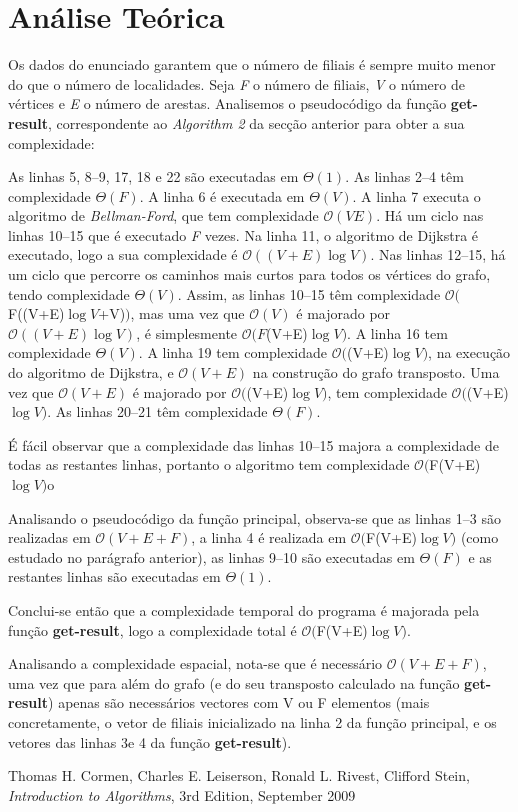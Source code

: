 \documentclass[12pt,a4paper,notitlepage]{article}
\renewcommand{\O}[1]{$\mathcal{O}(#1)$}
\begin{document}
\section{Análise Teórica}
Os dados do enunciado garantem que o número de filiais é sempre muito menor do que o número de localidades.
Seja \emph{F} o número de filiais, \emph{V} o número de vértices e \emph{E} o número de arestas.
Analisemos o pseudocódigo da função \textbf{get-result}, correspondente ao \emph{Algorithm 2} da secção anterior para obter a sua complexidade:

As linhas 5, 8--9, 17, 18 e 22 são executadas em $\Theta(1)$.
As linhas 2--4 têm complexidade $\Theta(F)$.
A linha 6 é executada em $\Theta(V)$.
A linha 7 executa o algoritmo de \emph{Bellman-Ford}, que tem complexidade \O{VE}.
Há um ciclo nas linhas 10--15 que é executado \emph{F} vezes.
Na linha 11, o algoritmo de Dijkstra é executado, logo a sua complexidade é \O{(V+E)\log{V}}.
Nas linhas 12--15, há um ciclo que percorre os caminhos mais curtos para todos os vértices do grafo, tendo complexidade $\Theta(V)$.
Assim, as linhas 10--15 têm complexidade \O{$F((V+E)$\log{V}$+V)$}, mas uma vez que \O{V} é majorado por \O{(V+E)\log{V}}, é simplesmente \O{F$(V+E)$\log{V}}.
A linha 16 tem complexidade $\Theta(V)$.
A linha 19 tem complexidade \O{$(V+E)$\log{V}}, na execução do algoritmo de Dijkstra, e \O{V+E} na construção do grafo transposto. Uma vez que \O{V+E} é majorado por \O{$(V+E)$\log{V}}, tem complexidade \O{$(V+E)$\log{V}}.
As linhas 20--21 têm complexidade $\Theta(F)$.

É fácil observar que a complexidade das linhas 10--15 majora a complexidade de todas as restantes linhas, portanto o algoritmo tem complexidade \O{$F(V+E)$\log{V}}o

Analisando o pseudocódigo da função principal, observa-se que as linhas 1--3 são realizadas em \O{V+E+F}, a linha 4 é realizada em \O{$F(V+E)$\log{V}} (como estudado no parágrafo anterior), as linhas 9--10 são executadas em $\Theta(F)$ e as restantes linhas são executadas em $\Theta(1)$.

Conclui-se então que a complexidade temporal do programa é majorada pela função \textbf{get-result}, logo a complexidade total é \O{$F(V+E)$\log{V}}.

Analisando a complexidade espacial, nota-se que é necessário \O{V+E+F}, uma vez que para além do grafo (e do seu transposto calculado na função \textbf{get-result}) apenas são necessários vectores com V ou F elementos (mais concretamente, o vetor de filiais inicializado na linha 2 da função principal, e os vetores das linhas 3e 4 da função \textbf{get-result}).

\begin{thebibliography}{9}
				Thomas H. Cormen,
				Charles E. Leiserson,
				Ronald L. Rivest,
				Clifford Stein,
				\emph{Introduction to Algorithms},
				3rd Edition,
				September 2009
\end{thebibliography}
\end{document}
